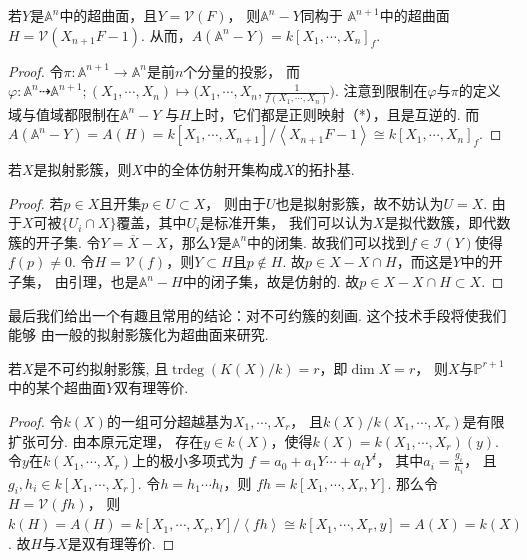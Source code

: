     \begin{lemma}
        若$Y$是$\mathbb{A}^{n}$中的超曲面，且$Y = \mathcal{V}(F)$，
        则$\mathbb{A}^{n}-Y$同构于
        $\mathbb{A}^{n+1}$中的超曲面$H=\mathcal{V}(X_{n+1}F-1)$.
        从而，$A(\mathbb{A}^{n}-Y) = k[X_{1},\cdots,X_{n}]_{f}$.
    \end{lemma}
    \begin{proof}
        令$\pi\colon\mathbb{A}^{n+1} \rightarrow \mathbb{A}^{n}$是前$n$个分量的投影，
        而$\varphi\colon\mathbb{A}^{n} \dashrightarrow \mathbb{A}^{n+1};
        (X_{1},\cdots,X_{n}) \mapsto \big(X_{1},\cdots,X_{n},\frac{1}{f(X_{1},\cdots,X_{n})}\big)$.
        注意到限制在$\varphi$与$\pi$的定义域与值域都限制在$\mathbb{A}^{n}-Y$
        与$H$上时，它们都是正则映射（*），且是互逆的. 
        而$A(\mathbb{A}^{n}-Y) = A(H) 
        = k[X_{1},\cdots,X_{n+1}]/\left<X_{n+1}F-1\right> \cong k[X_{1},\cdots,X_{n}]_{f}$.
    \end{proof}

    \begin{theorem}
        若$X$是拟射影簇，则$X$中的全体仿射开集构成$X$的拓扑基.
    \end{theorem}
    \begin{proof}
        若$p \in X$且开集$p \in U \subset X$，
        则由于$U$也是拟射影簇，故不妨认为$U = X$. 
        由于$X$可被$\{U_{i} \cap X\}$覆盖，其中$U_{i}$是标准开集，
        我们可以认为$X$是拟代数簇，即代数簇的开子集. 
        令$Y = \overline{X} - X$，那么$Y$是$\mathbb{A}^{n}$中的闭集.
        故我们可以找到$f \in \mathcal{I}(Y)$使得$f(p) \neq 0$. 
        令$H = \mathcal{V}(f)$，则$Y \subset H$且$p \notin H$. 
        故$p \in X - X \cap H$，而这是$Y$中的开子集，
        由引理，也是$\mathbb{A}^{n}-H$中的闭子集，故是仿射的. 
        故$p \in X - X \cap H \subset X$.
    \end{proof}

    最后我们给出一个有趣且常用的结论：对不可约簇的刻画. 这个技术手段将使我们能够
    由一般的拟射影簇化为超曲面来研究.

    \begin{proposition}
        若$X$是不可约拟射影簇, 且$\operatorname{trdeg}(K(X)/k)=r$，即$\dim X=r$，
        则$X$与$\mathbb{P}^{r+1}$中的某个超曲面$Y$双有理等价.
    \end{proposition}
    \begin{proof}
        令$k(X)$的一组可分超越基为$X_{1},\cdots,X_{r}$，
        且$k(X)/k(X_{1},\cdots,X_{r})$是有限扩张可分.
        由本原元定理，
        存在$y \in k(X)$，使得$k(X)=k(X_{1},\cdots,X_{r})(y)$.
        令$y$在$k(X_{1},\cdots,X_{r})$上的极小多项式为
        $f=a_{0}+a_{1}Y\cdots+a_{l}Y^{l}$，
        其中$a_{i}=\frac{g_{i}}{h_{i}}$，
        且$g_{i},h_{i} \in k[X_{1},\cdots,X_{r}]$.
        令$h=h_{1}\cdots h_{l}$，则
        $fh=k[X_{1},\cdots,X_{r},Y]$. 
        那么令$H=\mathcal{V}(fh)$，
        则$k(H)=A(H)=k[X_{1},\cdots,X_{r},Y]/\left<fh\right> \cong
        k[X_{1},\cdots,X_{r},y]=A(X)=k(X)$. 故$H$与$X$是双有理等价.
    \end{proof}

